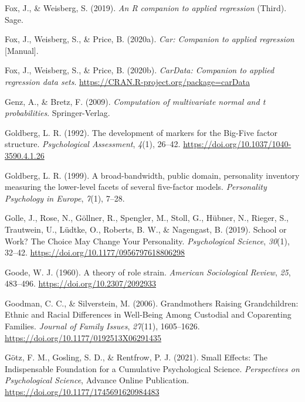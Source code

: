 \documentclass[
  english,
  man,floatsintext]{apa7}
\begin{document}
\leavevmode\hypertarget{ref-car2019}{}%
Fox, J., \& Weisberg, S. (2019). \emph{An R companion to applied regression} (Third). Sage.

\leavevmode\hypertarget{ref-R-car}{}%
Fox, J., Weisberg, S., \& Price, B. (2020a). \emph{Car: Companion to applied regression} {[}Manual{]}.

\leavevmode\hypertarget{ref-R-carData}{}%
Fox, J., Weisberg, S., \& Price, B. (2020b). \emph{CarData: Companion to applied regression data sets}. \url{https://CRAN.R-project.org/package=carData}

\leavevmode\hypertarget{ref-R-mvtnorm}{}%
Genz, A., \& Bretz, F. (2009). \emph{Computation of multivariate normal and t probabilities}. Springer-Verlag.

\leavevmode\hypertarget{ref-goldbergDevelopmentMarkersBigFive1992}{}%
Goldberg, L. R. (1992). The development of markers for the Big-Five factor structure. \emph{Psychological Assessment}, \emph{4}(1), 26--42. \url{https://doi.org/10.1037/1040-3590.4.1.26}

\leavevmode\hypertarget{ref-goldbergBroadbandwidthPublicDomain1999}{}%
Goldberg, L. R. (1999). A broad-bandwidth, public domain, personality inventory measuring the lower-level facets of several five-factor models. \emph{Personality Psychology in Europe}, \emph{7}(1), 7--28.

\leavevmode\hypertarget{ref-golleSchoolWorkChoice2019}{}%
Golle, J., Rose, N., Göllner, R., Spengler, M., Stoll, G., Hübner, N., Rieger, S., Trautwein, U., Lüdtke, O., Roberts, B. W., \& Nagengast, B. (2019). School or Work? The Choice May Change Your Personality. \emph{Psychological Science}, \emph{30}(1), 32--42. \url{https://doi.org/10.1177/0956797618806298}

\leavevmode\hypertarget{ref-goodeTheoryRoleStrain1960}{}%
Goode, W. J. (1960). A theory of role strain. \emph{American Sociological Review}, \emph{25}, 483--496. \url{https://doi.org/10.2307/2092933}

\leavevmode\hypertarget{ref-goodmanGrandmothersRaisingGrandchildren2006}{}%
Goodman, C. C., \& Silverstein, M. (2006). Grandmothers Raising Grandchildren: Ethnic and Racial Differences in Well-Being Among Custodial and Coparenting Families. \emph{Journal of Family Issues}, \emph{27}(11), 1605--1626. \url{https://doi.org/10.1177/0192513X06291435}

\leavevmode\hypertarget{ref-gotzSmallEffectsIndispensable2021}{}%
Götz, F. M., Gosling, S. D., \& Rentfrow, P. J. (2021). Small Effects: The Indispensable Foundation for a Cumulative Psychological Science. \emph{Perspectives on Psychological Science}, Advance Online Publication. \url{https://doi.org/10.1177/1745691620984483}
\end{document}
